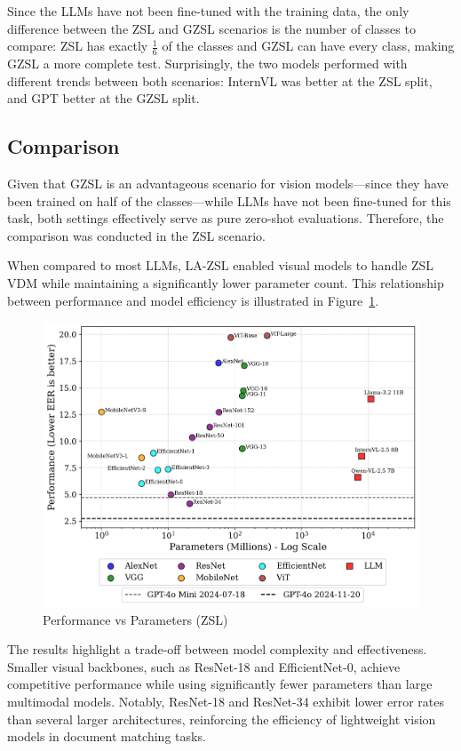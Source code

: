 Since the \glspl{LLM} have not been fine-tuned with the training data, the only difference between the \gls{ZSL} and \gls{GZSL} scenarios is the number of classes to compare: \gls{ZSL} has exactly $\frac{1}{6}$ of the classes and \gls{GZSL} can have every class, making \gls{GZSL} a more complete test. Surprisingly, the two models performed with different trends between both scenarios: InternVL was better at the \gls{ZSL} split, and GPT better at the \gls{GZSL} split.

\subsection{Comparison}
\label{sec:comparison_result}

Given that \gls{GZSL} is an advantageous scenario for vision models—since they have been trained on half of the classes—while \glspl{LLM} have not been fine-tuned for this task, both settings effectively serve as pure zero-shot evaluations. Therefore, the comparison was conducted in the \gls{ZSL} scenario.

When compared to most \glspl{LLM}, \gls{LA-ZSL} enabled visual models to handle \gls{ZSL} \gls{VDM} while maintaining a significantly lower parameter count. This relationship between performance and model efficiency is illustrated in Figure~\ref{fig:performance}.

\begin{figure}[htbp]
\centering
\includegraphics[width=1\linewidth]{images/performance_vs_parameters.png}
\caption{Performance vs Parameters (ZSL)\label{fig:performance}}
\end{figure}  

The results highlight a trade-off between model complexity and effectiveness. Smaller visual backbones, such as ResNet-18 and EfficientNet-0, achieve competitive performance while using significantly fewer parameters than large multimodal models. Notably, ResNet-18 and ResNet-34 exhibit lower error rates than several larger architectures, reinforcing the efficiency of lightweight vision models in document matching tasks.
